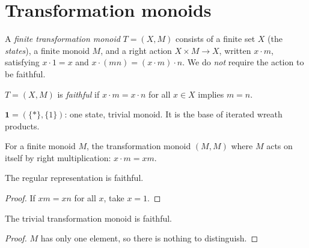 \chapter{Transformation monoids}\label{ch:transmon}

\begin{definition}\label{def:transmon}
  \leanok
  A \emph{finite transformation monoid} $T = (X, M)$ consists of a finite
  set $X$ (the \emph{states}), a finite monoid $M$, and a right action
  $X \times M \to X$, written $x \cdot m$, satisfying $x \cdot 1 = x$ and
  $x \cdot (mn) = (x \cdot m) \cdot n$.
  We do \emph{not} require the action to be faithful.
\end{definition}

\begin{definition}[Faithfulness]\label{def:faithful}
  \leanok{}
  $T = (X,M)$ is \emph{faithful} if $x \cdot m = x \cdot n$ for all
  $x \in X$ implies $m = n$.
\end{definition}

\begin{definition}\label{def:trivialTM}
  \leanok{}
  $\mathbf{1} = (\{*\}, \{1\})$: one state, trivial monoid. It is the base
  of iterated wreath products.
\end{definition}

\begin{definition}\label{def:regular}
  \leanok{}
  For a finite monoid $M$, the transformation monoid $(M, M)$ where $M$
  acts on itself by right multiplication: $x \cdot m = xm$.
\end{definition}

\begin{lemma}\label{lem:regular-faithful}
  \leanok{}
  The regular representation is faithful.
\end{lemma}
\begin{proof}
  \leanok
  If $xm = xn$ for all $x$, take $x = 1$.
\end{proof}

\begin{lemma}\label{lem:trivialTM-faithful}
  \leanok{}
  The trivial transformation monoid is faithful.
\end{lemma}
\begin{proof}
  \leanok
  $M$ has only one element, so there is nothing to distinguish.
\end{proof}
